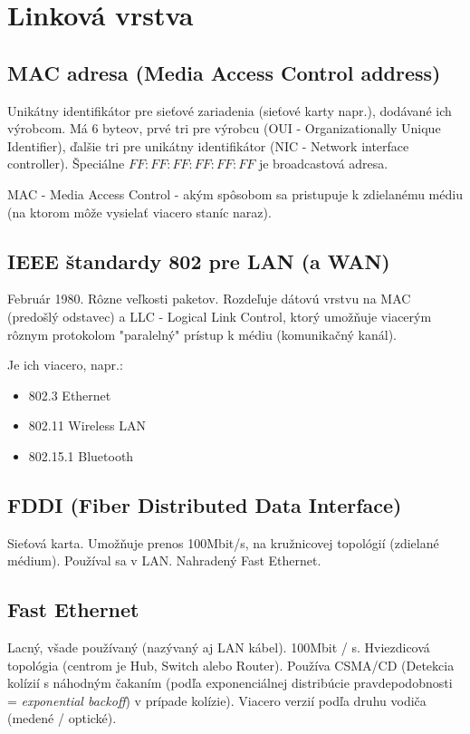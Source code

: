 \documentclass[10pt,a4paper]{article}
\begin{document}
\section{Linková vrstva}        
\subsection{MAC adresa (Media Access Control address)}     
Unikátny identifikátor pre sieťové zariadenia (sieťové karty napr.),
dodávané ich výrobcom. Má 6 byteov, prvé tri pre výrobcu (OUI - Organizationally Unique Identifier), ďalšie tri pre unikátny identifikátor (NIC - Network interface controller). Špeciálne $FF:FF:FF:FF:FF:FF$ je broadcastová adresa. 
          
MAC -  Media Access Control - akým spôsobom sa pristupuje k zdielanému médiu (na ktorom môže vysielať viacero staníc naraz).          
\subsection{IEEE štandardy 802 pre LAN (a WAN)}  
Február 1980. Rôzne veľkosti paketov. Rozdeľuje dátovú vrstvu na MAC  (predošlý odstavec) a LLC - Logical Link Control, ktorý umožňuje viacerým rôznym protokolom "paralelný" prístup k médiu (komunikačný kanál).

Je ich viacero, napr.:
\begin{itemize}
\item 802.3 Ethernet      
\item 802.11 Wireless LAN
\item 802.15.1 Bluetooth 
\end{itemize}

\subsection{FDDI (Fiber Distributed Data Interface)}  
Sieťová karta. Umožňuje prenos 100Mbit/s, na kružnicovej topológií (zdielané médium). Používal sa v LAN. Nahradený Fast Ethernet.    
                 
\subsection{Fast Ethernet}            
Lacný, všade používaný (nazývaný aj LAN kábel).
100Mbit / s. Hviezdicová topológia (centrom je Hub, Switch alebo Router).
Používa CSMA/CD (Detekcia kolízií s náhodným čakaním (podľa exponenciálnej distribúcie pravdepodobnosti = \emph{exponential backoff}) v prípade kolízie). Viacero verzií podľa druhu vodiča (medené / optické).
\end{document}
